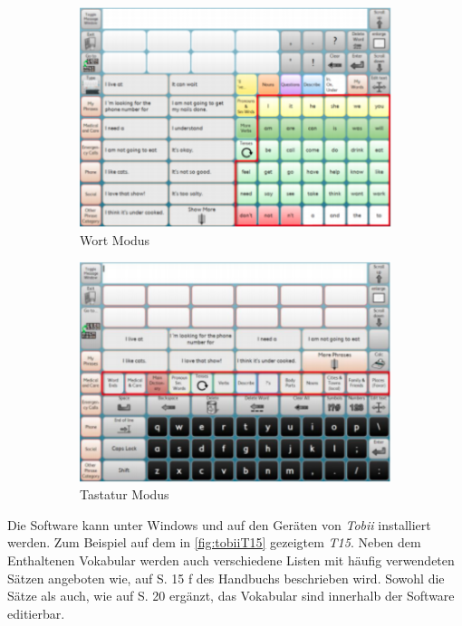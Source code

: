             \begin{figure}[H]
				\centering
				\begin{subfigure}{.49\linewidth}
  					\centering
  					\includegraphics[width=.8\linewidth]{images/sonoScribeWords.png}
  					\caption{Wort Modus 
                    	\parencite[S. 13]{tobii:sonoScribeManual}
                    }
                    \label{fig:sonoScribeWords}
				\end{subfigure}
				\begin{subfigure}{.49\linewidth}
  					\centering
  					\includegraphics[width=.8\linewidth]{images/SonoScribeKeboard.png}
  					\caption{Tastatur Modus 
                    	\parencite[S. 22]{tobii:sonoScribeManual}
                    }
                    \label{fig:sonoScribeKeyboard}
				\end{subfigure}
                \caption{ }
                \label{fig:sonoScribe}
			\end{figure}
        	
            Die Software kann unter Windows und auf den Geräten von \emph{Tobii} installiert werden. Zum Beispiel auf dem in \autoref{fig:tobiiT15} gezeigtem \emph{T15}. Neben dem Enthaltenen Vokabular werden auch verschiedene Listen mit häufig verwendeten Sätzen angeboten wie, auf S. 15 f des Handbuchs beschrieben wird. Sowohl die Sätze als auch, wie auf S. 20 ergänzt, das Vokabular sind innerhalb der Software editierbar.
            
